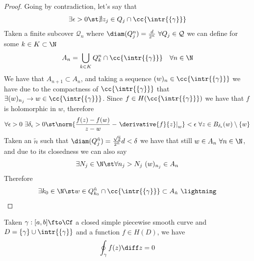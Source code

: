 \documentclass[../mmf.tex]{subfiles}
\begin{document}
\begin{proof}
	Going by contradiction, let's say that
	\begin{equation*}
		\exists\epsilon>0\st\nexists z_j\in Q_j\cap\cc{\intr{\{\gamma\}}}
	\end{equation*}
	Taken a finite subcover $\mathcal{Q}_n$ where $\diam(Q^n_j)=\frac{d}{2^n}\ \forall Q_j\in\mathcal{Q}$ we can define for some $k\in K\subset\N$
	\begin{equation*}
		A_n=\bigcup_{k\in K}Q^n_{k}\cap\cc{\intr{\{\gamma\}}}\quad\forall n\in\N
	\end{equation*}
	We have that $A_{n+1}\subset A_n$, and taking a sequence $(w)_n\in\cc{\intr{\{\gamma\}}}$ we have due to the compactness of $\cc{\intr{\{\gamma\}}}$ that $\exists(w)_{n_j}\to w\in\cc{\intr{\{\gamma\}}}$. Since $f\in H(\cc{\intr{\{\gamma\}}})$ we have that $f$ is holomorphic in $w$, therefore
	\begin{equation*}
		\forall\epsilon>0\ \exists\delta_\epsilon>0\st\norm{\frac{f(z)-f(w)}{z-w}-\left.\derivative{f}{z}\right|_w}<\epsilon\ \forall z\in B_{\delta_\epsilon}(w)\setminus\{w\}
	\end{equation*}
	Taken an $\tilde{n}$ such that $\diam(Q^{\tilde{n}}_j)=\frac{\sqrt{2}}{2^{\tilde{n}}}d<\delta$ we have that still $w\in A_n\ \forall n\in\N$, and due to its closedness we can also say
	\begin{equation*}
		\exists N_j\in\N\st\forall n_j>N_j\ (w)_{n_j}\in A_n
	\end{equation*}
	Therefore
	\begin{equation*}
		\exists k_0\in\N\st w\in Q^{\tilde{n}}_{k_0}\cap\cc{\intr{\{\gamma\}}}\subset A_{\tilde{n}}\ \lightning
	\end{equation*}
\end{proof}
\begin{thm}
	Taken $\gamma:[a,b]\fto\Cf$ a closed simple piecewise smooth curve and $D=\{\gamma\}\cup\intr{\{\gamma\}}$ and a function $f\in H(D)$, we have
	\begin{equation}
		\oint_{\gamma}f(z)\diff z=0
		\label{eq:cauchygoursat}
	\end{equation}
\end{thm}
\end{document}

